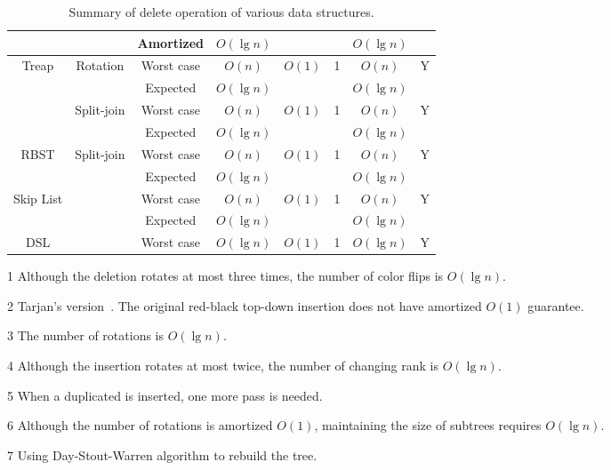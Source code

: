 \begin{table}[!t]
\begin{threeparttable}
\begin{tabular}{cccccccc}
  & & Amortized & $O(\lg n)$ & & & $O(\lg n)$ & \\
  \hline
  \multirow{4}{*}{Treap} & \multirow{2}{*}{Rotation} & Worst case & $O(n)$ & \multirow{2}{*}{$O(1)$} & \multirow{2}{*}{1} & $O(n)$ & \multirow{2}{*}{Y} \\
  & & Expected & $O(\lg n)$ &  & & $O(\lg n)$ & \\
  & \multirow{2}{*}{Split-join} & Worst case & $O(n)$ & \multirow{2}{*}{$O(1)$} & \multirow{2}{*}{1} & $O(n)$ & \multirow{2}{*}{Y} \\
  & & Expected & $O(\lg n)$ & & & $O(\lg n)$ & \\
  \hline
  \multirow{2}{*}{RBST} & \multirow{2}{*}{Split-join}& Worst case & $O(n)$ & \multirow{2}{*}{$O(1)$} & \multirow{2}{*}{1} & $O(n)$ & \multirow{2}{*}{Y} \\
  & & Expected & $O(\lg n)$ &  & & $O(\lg n)$ & \\
  \hline
  \multirow{2}{*}{Skip List} & & Worst case & $O(n)$ & \multirow{2}{*}{$O(1)$} & \multirow{2}{*}{1} & $O(n)$ & \multirow{2}{*}{Y} \\
  & & Expected & $O(\lg n)$ & & & $O(\lg n)$ & \\
  \hline
  DSL & & Worst case & $O(\lg n)$ & $O(1)$ & 1 & $O(\lg n)$ & Y \\
\end{tabular}
\begin{tablenotes}\footnotesize
\item[1] Although the deletion rotates at most three times, the number of color flips is $O(\lg n)$.
\item[2] Tarjan's version~\cite{Tarjan1985}. The original red-black top-down insertion does not have amortized $O(1)$ guarantee.
\item[3] The number of rotations is $O(\lg n)$.
\item[4] Although the insertion rotates at most twice, the number of changing rank is $O(\lg n)$.
\item[5] When a duplicated is inserted, one more pass is needed.
\item[6] Although the number of rotations is amortized $O(1)$, maintaining the size of subtrees requires $O(\lg n)$.
\item[7] Using Day-Stout-Warren algorithm to rebuild the tree.
\end{tablenotes}
\caption{Summary of delete operation of various data structures.}\label{delete}
\end{threeparttable}
\end{table}

\printbibliography[heading=subbibliography]